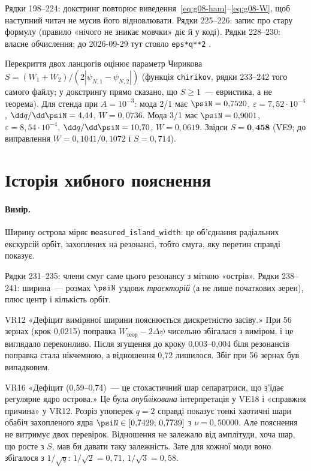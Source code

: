 
Рядки 198--224: докстринг повторює виведення~\eqref{eq:g08-ham}--\eqref{eq:g08-W}, щоб наступний
читач не мусив його відновлювати. Рядки 225--226: запис про стару формулу (правило «нічого не
зникає мовчки» діє й у коді). Рядки 228--230: власне обчислення; до 2026-09-29 тут стояло
\verb|eps*q**2| \cite{g08Changes}.

Перекриття двох ланцюгів оцінює параметр Чирикова
$S=(W_1+W_2)/(2|\psi_{N,1}-\psi_{N,2}|)$ (функція \texttt{chirikov}, рядки 233--242 того самого
файлу; у докстрингу прямо сказано, що $S\ge1$~--- евристика, а не теорема). Для стенда при
$A=10^{-3}$: мода 2/1 має $\psiN=0{,}7520$, $\varepsilon=7{,}52\cdot10^{-4}$,
$\dd q/\dd\psiN=4{,}44$, $W=0{,}0736$. Мода 3/1 має $\psiN=0{,}9001$,
$\varepsilon=8{,}54\cdot10^{-4}$, $\dd q/\dd\psiN=10{,}70$, $W=0{,}0619$. Звідси
$S=\mathbf{0{,}458}$ (VE9; до виправлення $W=0{,}1041/0{,}1072$ і $S=0{,}714$).

\section{Історія хибного пояснення}\label{sec:g08-story}

\paragraph{Вимір.} Ширину острова міряє \texttt{measured\_island\_width}: це об'єднання
радіальних екскурсій орбіт, захоплених на резонансі, тобто смуга, яку перетин справді показує.


Рядки 231--235: члени смуг саме цього резонансу з міткою «острів». Рядки 238--241: ширина~---
розмах $\psiN$ уздовж \emph{траєкторій} (а не лише початкових зерен), плюс центр і кількість
орбіт.

\begin{refuted}{VR12}
«Дефіцит виміряної ширини пояснюється дискретністю засіву.» При 56 зернах (крок 0,0215)
поправка $W_{\text{теор}}-2\Delta\psi$ чисельно збігалася з виміром, і це виглядало переконливо.
Після згущення до кроку 0,003--0,004 біля резонансів поправка стала нікчемною, а відношення
0,72 лишилося. Збіг при 56 зернах був випадковим.
\end{refuted}

\begin{refuted}{VR16}
«Дефіцит (0,59--0,74)~--- це стохастичний шар сепаратриси, що з'їдає регулярне ядро острова.»
Це була \emph{опублікована} інтерпретація у VE18 і «справжня причина» у VR12. Розріз упоперек
$q=2$ справді показує тонкі хаотичні шари обабіч захопленого ядра $\psiN\in[0{,}7429;\,0{,}7739]$
з $\nu=0{,}50000$. Але пояснення не витримує двох перевірок. Відношення не залежало від
амплітуди, хоча шар, що росте з $S$, мав би давати таку залежність. Зате для кожної моди воно
збігалося з $1/\sqrt q$: $1/\sqrt2=0{,}71$, $1/\sqrt3=0{,}58$.
\end{refuted}


